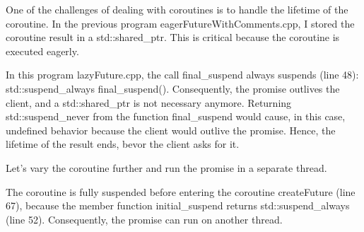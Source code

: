 \begin{tcolorbox}[breakable,enhanced jigsaw,colback=red!5!white,colframe=red!75!black,title={About the Numbers}]
One of the challenges of dealing with coroutines is to handle the lifetime of the coroutine. In the previous program eagerFutureWithComments.cpp, I stored the coroutine result in a std::shared\_ptr. This is critical because the coroutine is executed eagerly.

In this program lazyFuture.cpp, the call final\_suspend always suspends (line 48): std::suspend\_always final\_suspend(). Consequently, the promise outlives the client, and a std::shared\_ptr is not necessary anymore. Returning std::suspend\_never from the function final\_suspend would cause, in this case, undefined behavior because the client would outlive the promise. Hence, the lifetime of the result ends, bevor the client asks for it.
\end{tcolorbox}

Let’s vary the coroutine further and run the promise in a separate thread.


The coroutine is fully suspended before entering the coroutine createFuture (line 67), because the member function initial\_suspend returns std::suspend\_always (line 52). Consequently, the promise can run on another thread.

